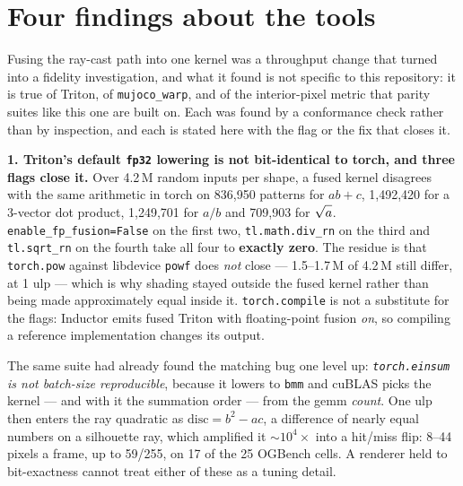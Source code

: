 \documentclass{article}
\begin{document}
\section{Four findings about the tools}
\label{sec:fidelity}

Fusing the ray-cast path into one kernel was a throughput change that turned
into a fidelity investigation, and what it found is not specific to this
repository: it is true of Triton, of \texttt{mujoco\_warp}, and of the
interior-pixel metric that parity suites like this one are built on. Each was
found by a conformance check rather than by inspection, and each is stated here
with the flag or the fix that closes it.

\textbf{1. Triton's default \texttt{fp32} lowering is not bit-identical to
torch, and three flags close it.} Over 4.2\,M random inputs per shape, a fused
kernel disagrees with the same arithmetic in torch on 836,950 patterns for
$ab+c$, 1,492,420 for a 3-vector dot product, 1,249,701 for $a/b$ and 709,903
for $\sqrt{\vphantom{b}a}$. \texttt{enable\_fp\_fusion=False} on the first two,
\texttt{tl.math.div\_rn} on the third and \texttt{tl.sqrt\_rn} on the fourth
take all four to \textbf{exactly zero}. The residue is that
\texttt{torch.pow} against libdevice \texttt{powf} does \emph{not} close ---
1.5--1.7\,M of 4.2\,M still differ, at 1 ulp --- which is why shading stayed
outside the fused kernel rather than being made approximately equal inside it.
\texttt{torch.compile} is not a substitute for the flags: Inductor emits fused
Triton with floating-point fusion \emph{on}, so compiling a reference
implementation changes its output.

The same suite had already found the matching bug one level up:
\emph{\texttt{torch.einsum} is not batch-size reproducible}, because it lowers
to \texttt{bmm} and cuBLAS picks the kernel --- and with it the summation
order --- from the gemm \emph{count}. One ulp then enters the ray quadratic as
$\mathrm{disc} = b^2 - ac$, a difference of nearly equal numbers on a
silhouette ray, which amplified it ${\sim}10^{4}\times$ into a hit/miss flip:
8--44 pixels a frame, up to 59/255, on 17 of the 25 OGBench cells. A renderer
held to bit-exactness cannot treat either of these as a tuning detail.
\end{document}
